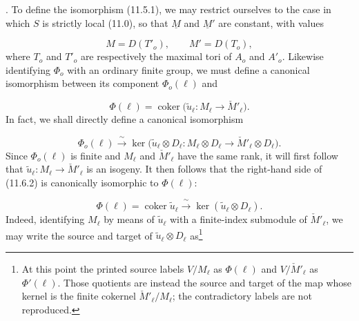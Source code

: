 
\medskip
{}. To define the isomorphism (11.5.1), we may restrict ourselves to
the case in which $S$ is strictly local (11.0), so that $\underline M$
and $\underline M'$ are constant, with values

\begin{equation}\tag{11.6.1}
M=D(T'_o),\qquad M'=D(T_o),
\end{equation}
where $T_o$ and $T'_o$ are respectively the maximal tori of $A_o$ and
$A'_o$. Likewise identifying $\Phi_o$ with an ordinary finite group,
we must define a canonical isomorphism between its component
$\Phi_o(\ell)$ and

\begin{equation*}
\Phi(\ell)=\operatorname{coker}\bigl(
 \widetilde u_\ell:M_\ell\longrightarrow\check M'_\ell\bigr).
\end{equation*}
In fact, we shall directly define a canonical isomorphism

\begin{equation}\tag{11.6.2}
\Phi_o(\ell)\xrightarrow{\ \sim\ }
 \ker\bigl(\widetilde u_\ell\otimes D_\ell:
 M_\ell\otimes D_\ell\longrightarrow
 \check M'_\ell\otimes D_\ell\bigr).
\end{equation}
Since $\Phi_o(\ell)$ is finite and $M_\ell$ and $\check M'_\ell$ have
the same rank, it will first follow that
$\widetilde u_\ell:M_\ell\to\check M'_\ell$ is an isogeny. It then
follows that the right-hand side of (11.6.2) is canonically isomorphic
to $\Phi(\ell)$:

\begin{equation}\tag{11.6.3}
\Phi(\ell)=\operatorname{coker}\widetilde u_\ell
 \xrightarrow{\ \sim\ }
 \ker(\widetilde u_\ell\otimes D_\ell).
\end{equation}
Indeed, identifying $M_\ell$ by means of $\widetilde u_\ell$ with a
finite-index submodule of $\check M'_\ell$, we may write the source and
target of $\widetilde u_\ell\otimes D_\ell$ as\footnote{At this point
the printed source labels $V/M_\ell$ as $\Phi(\ell)$ and
$V/\check M'_\ell$ as $\Phi'(\ell)$. Those quotients are instead the
source and target of the map whose kernel is the finite cokernel
$\check M'_\ell/M_\ell$; the contradictory labels are not reproduced.}

